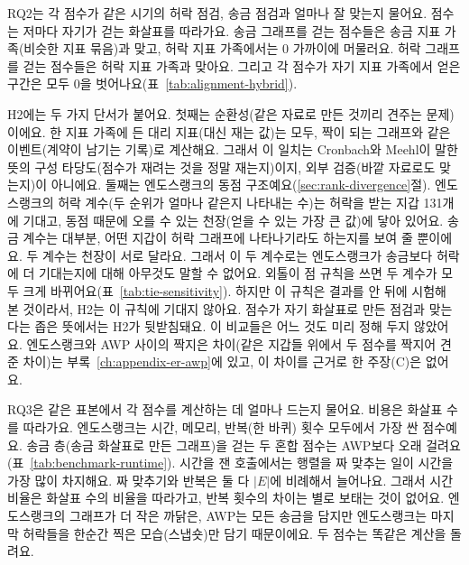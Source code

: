 
RQ2는 각 점수가 같은 시기의 허락 점검, 송금 점검과 얼마나 잘 맞는지 물어요. 점수는 저마다 자기가 걷는 화살표를 따라가요. 송금 그래프를 걷는 점수들은 송금 지표 가족(비슷한 지표 묶음)과 맞고, 허락 지표 가족에서는 0 가까이에 머물러요. 허락 그래프를 걷는 점수들은 허락 지표 가족과 맞아요. 그리고 각 점수가 자기 지표 가족에서 얻은 구간은 모두 0을 벗어나요(표~\ref{tab:alignment-hybrid}).

H2에는 두 가지 단서가 붙어요. 첫째는 순환성(같은 자료로 만든 것끼리 견주는 문제)이에요. 한 지표 가족에 든 대리 지표(대신 재는 값)는 모두, 짝이 되는 그래프와 같은 이벤트(계약이 남기는 기록)로 계산해요. 그래서 이 일치는 Cronbach와 Meehl이 말한 뜻의 구성 타당도(점수가 재려는 것을 정말 재는지)이지, 외부 검증(바깥 자료로도 맞는지)이 아니에요. 둘째는 엔도스랭크의 동점 구조예요(\ref{sec:rank-divergence}절). 엔도스랭크의 허락 계수(두 순위가 얼마나 같은지 나타내는 수)는 허락을 받는 지갑 131개에 기대고, 동점 때문에 오를 수 있는 천장(얻을 수 있는 가장 큰 값)에 닿아 있어요. 송금 계수는 대부분, 어떤 지갑이 허락 그래프에 나타나기라도 하는지를 보여 줄 뿐이에요. 두 계수는 천장이 서로 달라요. 그래서 이 두 계수로는 엔도스랭크가 송금보다 허락에 더 기대는지에 대해 아무것도 말할 수 없어요. 외톨이 점 규칙을 쓰면 두 계수가 모두 크게 바뀌어요(표~\ref{tab:tie-sensitivity}). 하지만 이 규칙은 결과를 안 뒤에 시험해 본 것이라서, H2는 이 규칙에 기대지 않아요. 점수가 자기 화살표로 만든 점검과 맞는다는 좁은 뜻에서는 H2가 뒷받침돼요. 이 비교들은 어느 것도 미리 정해 두지 않았어요. 엔도스랭크와 AWP 사이의 짝지은 차이(같은 지갑들 위에서 두 점수를 짝지어 견준 차이)는 부록~\ref{ch:appendix-er-awp}에 있고, 이 차이를 근거로 한 주장(C)은 없어요.


RQ3은 같은 표본에서 각 점수를 계산하는 데 얼마나 드는지 물어요. 비용은 화살표 수를 따라가요. 엔도스랭크는 시간, 메모리, 반복(한 바퀴) 횟수 모두에서 가장 싼 점수예요. 송금 층(송금 화살표로 만든 그래프)을 걷는 두 혼합 점수는 AWP보다 오래 걸려요(표~\ref{tab:benchmark-runtime}). 시간을 잰 호출에서는 행렬을 짜 맞추는 일이 시간을 가장 많이 차지해요. 짜 맞추기와 반복은 둘 다 $|E|$에 비례해서 늘어나요. 그래서 시간 비율은 화살표 수의 비율을 따라가고, 반복 횟수의 차이는 별로 보태는 것이 없어요. 엔도스랭크의 그래프가 더 작은 까닭은, AWP는 모든 송금을 담지만 엔도스랭크는 마지막 허락들을 한순간 찍은 모습(스냅숏)만 담기 때문이에요. 두 점수는 똑같은 계산을 돌려요.

